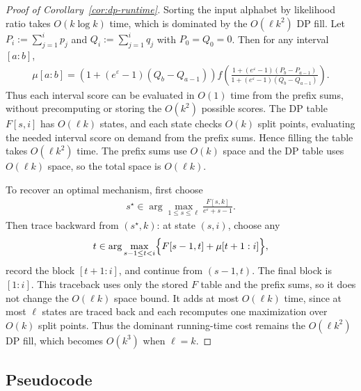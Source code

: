 \documentclass{article}
\theoremstyle{plain}
\theoremstyle{definition}
\theoremstyle{plain}
\begin{document}
\begin{proof}[Proof of Corollary~\ref{cor:dp-runtime}]
Sorting the input alphabet by likelihood ratio takes $O(k \log k)$ time, which is dominated by the $O(\ell k^2)$ DP fill. Let $P_i:=\sum_{j=1}^i p_j$ and $Q_i:=\sum_{j=1}^i q_j$ with $P_0=Q_0=0$. Then for any interval $[a:b]$,
\begin{align}
    \mu[a:b]
    =
    \left(1+(e^\varepsilon-1)(Q_b-Q_{a-1})\right)
    f\!\left(
        \frac{1+(e^\varepsilon-1)(P_b-P_{a-1})}
             {1+(e^\varepsilon-1)(Q_b-Q_{a-1})}
    \right).
\end{align}
Thus each interval score can be evaluated in $O(1)$ time from the prefix sums, without precomputing or storing the $O(k^2)$ possible scores.
The DP table $F[s,i]$ has $O(\ell k)$ states, and each state checks $O(k)$ split points, evaluating the needed interval score on demand from the prefix sums. Hence filling the table takes $O(\ell k^2)$ time. The prefix sums use $O(k)$ space and the DP table uses $O(\ell k)$ space, so the total space is $O(\ell k)$.

To recover an optimal mechanism, first choose
\begin{align}
    s^\star\in\arg\max_{1\le s\le \ell}
    \frac{F[s,k]}{e^\varepsilon+s-1}.
\end{align}
Then trace backward from $(s^\star,k)$: at state $(s,i)$, choose any
\begin{align}
    t\in\arg\max_{s-1\le t<i}
    \Bigl\{F[s-1,t]+\mu[t+1:i]\Bigr\},
\end{align}
record the block $[t+1:i]$, and continue from $(s-1,t)$. The final block is $[1:i]$. This traceback uses only the stored $F$ table and the prefix sums, so it does not change the $O(\ell k)$ space bound. It adds at most $O(\ell k)$ time, since at most $\ell$ states are traced back and each recomputes one maximization over $O(k)$ split points. Thus the dominant running-time cost remains the $O(\ell k^2)$ DP fill, which becomes $O(k^3)$ when $\ell=k$.
\end{proof}

\subsection{Pseudocode}
\label{sec:pseudocode}
\end{document}
